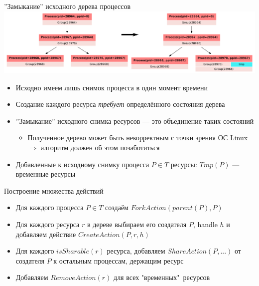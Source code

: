 \begin{frame}{''Замыкание'' исходного дерева процессов}
\includegraphics[width=\textwidth]{fig/pstreeClosure.pdf}

\begin{itemize}
	\item Исходно имеем лишь снимок процесса в один момент времени
	\item Создание каждого ресурса \emph{требует} \alert{определённого состояния} дерева
	\item ''Замыкание'' исходного снимка ресурсов --- это объединение таких состояний
	\begin{itemize}
		\item Полученное дерево может быть некорректным с точки зрения ОС Linux $\Rightarrow$ алгоритм должен об этом позаботиться
	\end{itemize}
	\item Добавленные к исходному снимку процесса $P \in T$ ресурсы: $Tmp(P)$ --- временные ресурсы 

\end{itemize}
\end{frame}

\begin{frame}{Построение множества действий}
\begin{itemize}
	\item Для каждого процесса $P \in T$ создаём $ForkAction(parent(P), P)$
	\item Для каждого ресурса $r$ в дереве выбираем его создателя $P$, handle $h$ и добавляем действие $CreateAction(P, r, h)$
	\item Для каждого $isSharable(r)$ ресурса, добавляем $ShareAction(P,...)$ от создателя $P$ к остальным процессам, держащим ресурс
	\item Добавляем $RemoveAction(r)$ для всех "временных"\ ресурсов
\end{itemize}
\end{frame}

